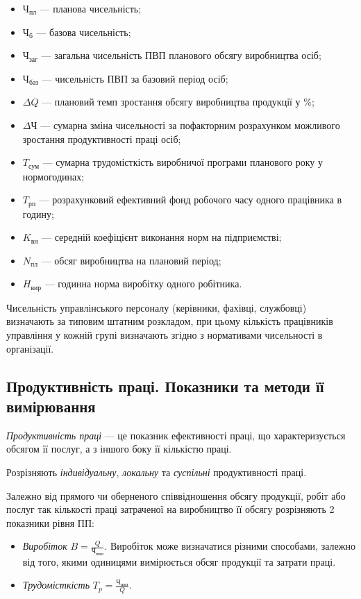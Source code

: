 \documentclass[a5paper,10pt,notitlepage,pdftex,headsepline]{scrartcl}
\begin{document}
    \begin{itemize}
      \item $\text{Ч}_\text{пл}$ --- планова чисельність;
      \item $\text{Ч}_\text{б}$ --- базова чисельність;
      \item $\text{Ч}_\text{заг}$ --- загальна чисельність ПВП планового
        обсягу виробництва осіб;
      \item $\text{Ч}_\text{баз}$ --- чисельність ПВП за базовий період осіб;
      \item $\Delta Q$ --- плановий темп зростання обсягу виробництва
        продукції у \%;
      \item $\Delta\text{Ч}$ --- сумарна зміна чисельності за пофакторним
        розрахунком можливого зростання продуктивності праці осіб;
      \item $T_\text{сум}$ --- сумарна трудомісткість виробничої програми
        планового року у нормогодинах;
      \item $T_\text{рп}$ --- розрахунковий ефективний фонд робочого часу
        одного працівника в годину;
      \item $K_\text{вн}$ --- середній коефіцієнт виконання норм на
        підприємстві;
      \item $N_\text{пл}$ --- обсяг виробництва на плановий період;
      \item $H_\text{вир}$ --- годинна норма виробітку одного робітника.
    \end{itemize}

    Чисельність управлінського персоналу (керівники, фахівці, службовці)
    визначають за типовим штатним розкладом, при цьому кількість працівників
    управління у кожній групі визначають згідно з нормативами чисельності в
    організації.
  \subsection{Продуктивність праці. Показники та методи її вимірювання}
    \emph{Продуктивність праці} --- це показник ефективності праці, що
    характеризується обсягом її послуг, а з іншого боку її кількістю праці.

    Розрізняють \emph{індивідуальну}, \emph{локальну} та \emph{суспільні}
    продуктивності праці.

    Залежно від прямого чи оберненого співвідношення обсягу продукції, робіт
    або послуг  так кількості праці затраченої на виробництво її обсягу
    розрізняють 2 показники рівня ПП:
    \begin{itemize}
      \item \emph{Виробіток} $\displaystyle B =\frac{Q}{\text{Ч}_\text{пвп}}$.
        Виробіток може визначатися різними способами, залежно від того, якими
        одиницями вимірюється обсяг продукції та затрати праці.
      \item \emph{Трудомісткість} $\displaystyle T_p =
        \frac{\text{Ч}_\text{пвп}}{Q}$.
    \end{itemize}
\end{document}
